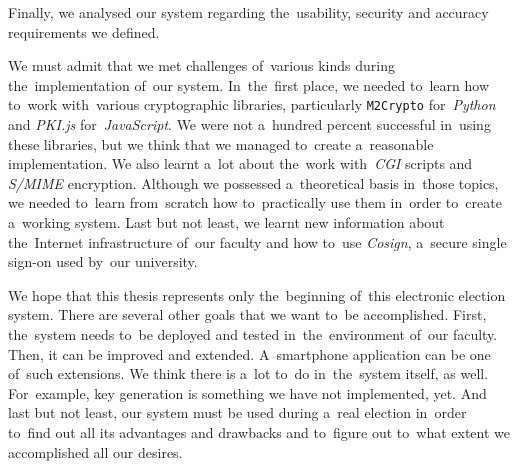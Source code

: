Finally, we analysed our system regarding the~usability, security and accuracy requirements we defined.

We must admit that we met challenges of~various kinds during the~implementation of~our system. In~the~first place, we needed to~learn how to~work with~various cryptographic libraries, particularly \texttt{M2Crypto} for~\emph{Python} and \emph{PKI.js} for~\emph{JavaScript}. We were not a~hundred percent successful in~using these libraries, but we think that we managed to~create a~reasonable implementation. We also learnt a~lot about the~work with~\emph{CGI} scripts and \emph{S/MIME} encryption. Although we possessed a~theoretical basis in~those topics, we needed to~learn from~scratch how to~practically use them in~order to~create a~working system. Last but not least, we learnt new information about the~Internet infrastructure of~our faculty and how to~use \emph{Cosign}, a~secure single sign-on used by~our university.

We hope that this thesis represents only the~beginning of~this electronic election system. There are several other goals that we want to~be accomplished. First, the~system needs to~be deployed and tested in~the~environment of~our faculty. Then, it can be improved and extended. A~smartphone application can be one of~such extensions. We think there is a~lot to~do in~the~system itself, as well. For~example, key generation is something we have not implemented, yet. And last but not least, our system must be used during a~real election in~order to~find out all its advantages and drawbacks and to~figure out to~what extent we accomplished all our desires.